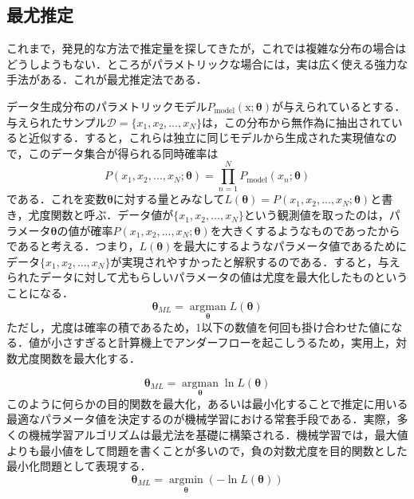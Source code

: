 \documentclass[a4paper,11pt]{jsreport}
\begin{document}
\subsection{最尤推定}
これまで，発見的な方法で推定量を探してきたが，これでは複雑な分布の場合はどうしようもない．ところがパラメトリックな場合には，実は広く使える強力な手法がある．これが最尤推定法である．\par
データ生成分布のパラメトリックモデル$P_{\text{model}}(\mathrm{x}; \bm{\theta})$が与えられているとする．与えられたサンプル$\mathcal{D} = \{x_1, x_2, \dots, x_N\}$は，この分布から無作為に抽出されていると近似する．すると，これらは独立に同じモデルから生成された実現値なので，このデータ集合が得られる同時確率は
\begin{equation*}
  P(x_1, x_2, \dots, x_N; \bm{\theta}) 
  = \prod_{n=1}^N P_{\text{model}}(x_n; \bm{\theta})
\end{equation*}
である．これを変数$\bm{\theta}$に対する量とみなして$L(\bm{\theta}) = P(x_1, x_2, \dots, x_N; \bm{\theta})$と書き，尤度関数と呼ぶ．データ値が$\{ x_1, x_2, \dots, x_N \}$という観測値を取ったのは，パラメータ$\bm{\theta}$の値が確率$P(x_1, x_2, \dots, x_N; \bm{\theta})$を大きくするようなものであったからであると考える．つまり，$L(\bm{\theta})$を最大にするようなパラメータ値であるためにデータ$\{ x_1, x_2, \dots, x_N \}$が実現されやすかったと解釈するのである．すると，与えられたデータに対して尤もらしいパラメータの値は尤度を最大化したものということになる．
\begin{equation}
  \bm{\theta}_{ML} = \underset{\bm{\theta}} {\operatorname{argman}} L(\bm{\theta})
\end{equation}
ただし，尤度は確率の積であるため，1以下の数値を何回も掛け合わせた値になる．値が小さすぎると計算機上でアンダーフローを起こしうるため，実用上，対数尤度関数を最大化する．\par
\begin{equation}
  \bm{\theta}_{ML} = \underset{\bm{\theta}} {\operatorname{argman}} \ln{L(\bm{\theta})}
\end{equation}
このように何らかの目的関数を最大化，あるいは最小化することで推定に用いる最適なパラメータ値を決定するのが機械学習における常套手段である．実際，多くの機械学習アルゴリズムは最尤法を基礎に構築される．機械学習では，最大値よりも最小値をして問題を書くことが多いので，負の対数尤度を目的関数とした最小化問題として表現する．
\begin{equation}
  \bm{\theta}_{ML} = \underset{\bm{\theta}} {\operatorname{argmin}} (-\ln{L(\bm{\theta})})
\end{equation}
\end{document}
